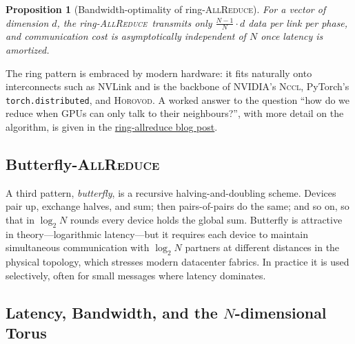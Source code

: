 \documentclass[11pt,a4paper]{article}
\theoremstyle{definition}
\theoremstyle{remark}
\theoremstyle{plain}
\newtheorem{proposition}[definition]{Proposition}
\newcommand{\GPU}[1]{\mathrm{GPU}_{#1}}
\newcommand{\allreduce}{\textsc{AllReduce}}
\begin{document}
\begin{center}
\end{center}

\begin{proposition}[Bandwidth-optimality of ring-\allreduce]
For a vector of dimension $d$, the ring-\allreduce\ transmits only
$\tfrac{N-1}{N} \cdot d$ data per link per phase, and communication cost
is asymptotically independent of $N$ once latency is amortized.
\end{proposition}

\noindent The ring pattern is embraced by modern hardware: it fits
naturally onto interconnects such as NVLink and is the backbone of
NVIDIA's \textsc{Nccl}, PyTorch's \texttt{torch.distributed}, and
\textsc{Horovod}. A worked answer to the question ``how do we reduce when
GPUs can only talk to their neighbours?'', with more detail on the
algorithm, is given in the
\href{https://tinyurl.com/ring-allreduce-blog}{ring-allreduce blog post}.

\subsection{Butterfly-\allreduce}

A third pattern, \emph{butterfly}, is a recursive halving-and-doubling
scheme. Devices pair up, exchange halves, and sum; then pairs-of-pairs do
the same; and so on, so that in $\log_2 N$ rounds every device holds the
global sum. Butterfly is attractive in theory---logarithmic latency---but
it requires each device to maintain simultaneous communication with
$\log_2 N$ partners at different distances in the physical topology,
which stresses modern datacenter fabrics. In practice it is used
selectively, often for small messages where latency dominates.

\subsection{Latency, Bandwidth, and the $N$-dimensional Torus}
\end{document}
